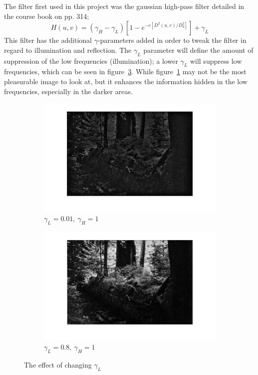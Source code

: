 \documentclass[a4paper]{article}
\begin{document}
		The filter first used in this project was
		the gaussian high-pass filter detailed in the course book on pp. 314; 
		\begin{equation}
		\label{eqn:gaussian_filter}
			H(u,v) = \left( \gamma_H - \gamma_L \right) \left[ 1 - e^{-c \left[D^2(u,v)/D_0^2\right]}\right] + \gamma_L 
		\end{equation}
		This filter has the additional $\gamma$-parameters added in order to tweak
		the filter in regard to illumination and reflection. The $\gamma_L$ parameter
		will define the amount of suppression of the low frequencies (illumination); a lower $\gamma_L$
		will suppress low frequencies, which can be seen in figure~\ref{fig:various_low_gamma}. While
		figure~\ref{fig:low_freq_supp} may not be the most pleasurable image to look at, but it 
		enhances the information hidden in the low frequencies, especially in the darker areas.
		\begin{figure}[h!]
		\centering
		\begin{subfigure}[b]{0.6\textwidth}
			\includegraphics[width=\textwidth]{../pics/suppressed_low_frequences.png}
			\caption{$\gamma_L = 0.01,~\gamma_H = 1$}
			\label{fig:low_freq_supp}
			\end{subfigure}%
			\begin{subfigure}[b]{0.6\textwidth}
			\includegraphics[width=\textwidth]{../pics/non_suppressed_low_frequences.png}
			\caption{$\gamma_L = 0.8,~\gamma_H = 1$}
			\label{fig:low_freq_non_supp}
			\end{subfigure}
			\label{fig:various_low_gamma}
			\caption{The effect of changing $\gamma_L$}				
		\end{figure}		
\end{document}
